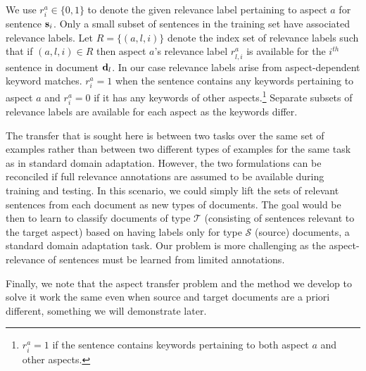 We use $r^a_{i} \in \{0,1\}$ to denote the given relevance label pertaining to aspect $a$ for sentence $\mathbf{s}_i$. Only a small subset of sentences in the training set have associated relevance labels. Let $R = \{(a,l,i)\}$ denote the index set of relevance labels such that if $(a,l,i)\in R$ then aspect $a$'s relevance label $r^a_{l,i}$ is available for the $i^{th}$ sentence in document $\mathbf{d}_l$. In our case relevance labels arise from aspect-dependent keyword matches. $r^a_{i}=1$ when the sentence contains any keywords pertaining to aspect $a$ and $r^a_i=0$ if it has any keywords of other aspects.\footnote{$r^a_i=1$ if the sentence contains keywords pertaining to both aspect $a$ and other aspects.} Separate subsets of relevance labels are available for each aspect as the keywords differ.

The transfer that is sought here is between two tasks over the same set of examples rather than between two different types of examples for the same task as in standard domain adaptation. However, the two formulations can be reconciled if full relevance annotations are assumed to be available during training and testing. In this scenario, we could simply lift the sets of relevant sentences from each document as new types of documents. The goal would be then to learn to classify documents of type $\mathcal{T}$ (consisting of sentences relevant to the target aspect) based on having labels only for type $\mathcal{S}$ (source) documents, a standard domain adaptation task. Our problem is more challenging as the aspect-relevance of sentences must be learned from limited annotations.

Finally, we note that the aspect transfer problem and the method we develop to solve it work the same even when source and target documents are a priori different, something we will demonstrate later. 


